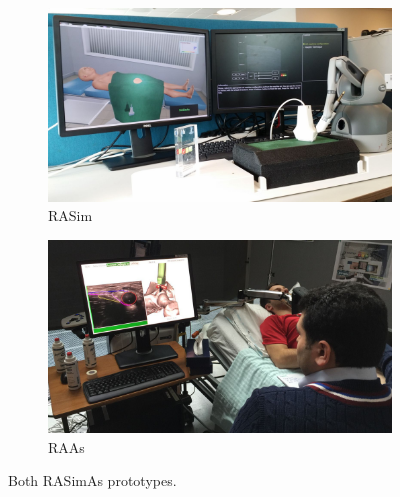 \begin{figure}[ht]
  \centering
  \begin{subfigure}[b]{0.5\linewidth}
    \centering\includegraphics[width=1\textwidth]{IMG/sim3.jpg}
    \caption{RASim \label{subfig:introrasim}}
  \end{subfigure}%
  \begin{subfigure}[b]{0.5\linewidth}
    \centering\includegraphics[width=1\textwidth]{IMG/raas.JPG}
    \caption{RAAs \label{subfig:introraas}}
  \end{subfigure}
  \caption{ Both RASimAs prototypes.}
\end{figure}




